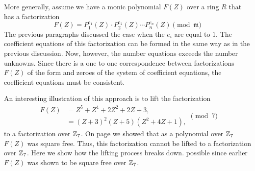 {\smallskip
More generally, assume we have a monic polynomial $F(Z)$ over a ring
$R$ that has a factorization
\begin{equation} \label{Hensel:NSQ:Eq}
F(Z) = P_1^{e_1}(Z) \cdot P_2^{e_2}(Z) \cdots P_n^{e_n}(Z)
\pmod{\mathfrak{m}}
\end{equation}
The previous paragraphs discussed the case when the $e_i$ are equal to
$1$.  The coefficient equations of this factorization can be formed in
the same way as in the previous discussion.  Now, however, the number
equations exceeds the number unknowns.  Since there is a one to one
correspondence between factorizations $F(Z)$ of the form
 and zeroes of the system of coefficient
equations, the coefficient equations must be consistent.

An interesting illustration of this approach is to lift the
factorization 
\[
\begin{aligned}
F(Z) & = Z^5 + Z^4 + 2Z^2 + 2Z + 3, \\
  & = (Z+3)^2 (Z+5) (Z^2 + 4Z+1),
\end{aligned}
\pmod{7}
\]
to a factorization over $\mathbb{Z}_7$.  On page \pageref{PolyZ7:SQFR:Ex} we showed that as
a polynomial over $\mathbb{Z}_7$ $F(Z)$ was square free.  Thus, this
factorization cannot be lifted to a factorization over $\mathbb{Z}_7$. Here we
show how the lifting process breaks down. possible since earlier $F(Z)$ was shown to be square free over $\mathbb{Z}_7$.

}
